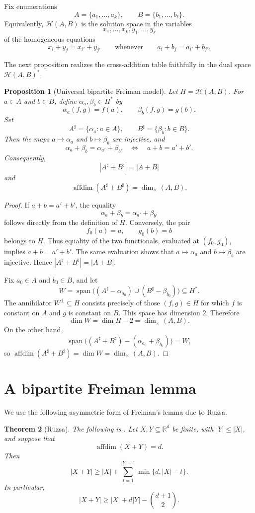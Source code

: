 \documentclass[11pt]{article}
\newtheorem{theorem}{Theorem}[section]
\newtheorem{proposition}[theorem]{Proposition}
\newcommand{\R}{\mathbb{R}}
\newcommand{\cH}{\mathcal{H}}
\newcommand{\affdim}{\operatorname{affdim}}
\newcommand{\spann}{\operatorname{span}}
\newcommand{\dimx}{\dim_{\times}}
\begin{document}
Fix enumerations
\[
 A=\{a_1,\ldots,a_k\},\qquad B=\{b_1,\ldots,b_\ell\}.
\]
Equivalently, $\cH(A,B)$ is the solution space in the variables
\[
 x_1,\ldots,x_k,y_1,\ldots,y_\ell
\]
of the homogeneous equations
\[
 x_i+y_j=x_{i'}+y_{j'}
 \qquad\text{whenever}\qquad
 a_i+b_j=a_{i'}+b_{j'}.
\]

The next proposition realizes the cross-addition table faithfully in the dual space $\cH(A,B)^*$.

\begin{proposition}[Universal bipartite Freiman model]\label{prop:universal}
Let $H=\cH(A,B)$.  For $a\in A$ and $b\in B$, define $\alpha_a,\beta_b\in H^*$ by
\[
 \alpha_a(f,g)=f(a),\qquad \beta_b(f,g)=g(b).
\]
Set
\[
 A^\sharp=\{\alpha_a:a\in A\},\qquad B^\sharp=\{\beta_b:b\in B\}.
\]
Then the maps $a\mapsto\alpha_a$ and $b\mapsto\beta_b$ are injective, and
\[
 \alpha_a+\beta_b=\alpha_{a'}+\beta_{b'}
 \quad\Longleftrightarrow\quad
 a+b=a'+b'.
\]
Consequently,
\[
 |A^\sharp+B^\sharp|=|A+B|
\]
and
\[
 \affdim(A^\sharp+B^\sharp)=\dimx(A,B).
\]
\end{proposition}

\begin{proof}
If $a+b=a'+b'$, the equality
\[
 \alpha_a+\beta_b=\alpha_{a'}+\beta_{b'}
\]
follows directly from the definition of $H$.  Conversely, the pair
\[
 f_0(a)=a,\qquad g_0(b)=b
\]
belongs to $H$.  Thus equality of the two functionals, evaluated at $(f_0,g_0)$, implies $a+b=a'+b'$.  The same evaluation shows that $a\mapsto\alpha_a$ and $b\mapsto\beta_b$ are injective.  Hence $|A^\sharp+B^\sharp|=|A+B|$.

Fix $a_0\in A$ and $b_0\in B$, and let
\[
 W=\spann\bigl((A^\sharp-\alpha_{a_0})\cup(B^\sharp-\beta_{b_0})\bigr)\subseteq H^*.
\]
The annihilator $W^\perp\subseteq H$ consists precisely of those $(f,g)\in H$ for which $f$ is constant on $A$ and $g$ is constant on $B$.  This space has dimension $2$.  Therefore
\[
 \dim W=\dim H-2=\dimx(A,B).
\]
On the other hand,
\[
 \spann\bigl((A^\sharp+B^\sharp)-(\alpha_{a_0}+\beta_{b_0})\bigr)=W,
\]
so $\affdim(A^\sharp+B^\sharp)=\dim W=\dimx(A,B)$.
\end{proof}

\section{A bipartite Freiman lemma}

We use the following asymmetric form of Freiman's lemma due to Ruzsa.

\begin{theorem}[Ruzsa]\label{thm:ruzsa}
The following is \cite[Theorem 1 and Corollary 1.1]{Ruzsa94}.  Let $X,Y\subseteq\R^d$ be finite, with $|Y|\le |X|$, and suppose that
\[
 \affdim(X+Y)=d.
\]
Then
\[
 |X+Y|\ge |X|+\sum_{t=1}^{|Y|-1}\min\{d,|X|-t\}.
\]
In particular,
\[
 |X+Y|\ge |X|+d|Y|-\binom{d+1}{2}.
\]
\end{theorem}
\end{document}
